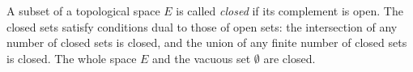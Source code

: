 A subset of a topological space $E$ is called \textit{closed} if its complement is open. The closed sets satisfy conditions dual to those of open sets: the intersection of any number of closed sets is closed, and the union of any finite number of closed sets is closed. The whole space $E$ and the vacuous set $\emptyset$ are closed.
